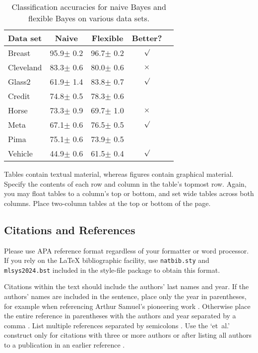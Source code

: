 \documentclass{article}
\begin{document}

\begin{table}[t]
\caption{Classification accuracies for naive Bayes and flexible
Bayes on various data sets.}
\label{sample-table}
\vskip 0.15in
\begin{center}
\begin{small}
\begin{sc}
\begin{tabular}{lcccr}
\toprule
Data set & Naive & Flexible & Better? \\
\midrule
Breast    & 95.9$\pm$ 0.2& 96.7$\pm$ 0.2& $\surd$ \\
Cleveland & 83.3$\pm$ 0.6& 80.0$\pm$ 0.6& $\times$\\
Glass2    & 61.9$\pm$ 1.4& 83.8$\pm$ 0.7& $\surd$ \\
Credit    & 74.8$\pm$ 0.5& 78.3$\pm$ 0.6&         \\
Horse     & 73.3$\pm$ 0.9& 69.7$\pm$ 1.0& $\times$\\
Meta      & 67.1$\pm$ 0.6& 76.5$\pm$ 0.5& $\surd$ \\
Pima      & 75.1$\pm$ 0.6& 73.9$\pm$ 0.5&         \\
Vehicle   & 44.9$\pm$ 0.6& 61.5$\pm$ 0.4& $\surd$ \\
\bottomrule
\end{tabular}
\end{sc}
\end{small}
\end{center}
\vskip -0.1in
\end{table}

Tables contain textual material, whereas figures contain graphical material.
Specify the contents of each row and column in the table's topmost
row. Again, you may float tables to a column's top or bottom, and set
wide tables across both columns. Place two-column tables at the
top or bottom of the page.

\subsection{Citations and References}

Please use APA reference format regardless of your formatter
or word processor. If you rely on the \LaTeX\/ bibliographic
facility, use \texttt{natbib.sty} and \texttt{mlsys2024.bst}
included in the style-file package to obtain this format.

Citations within the text should include the authors' last names and
year. If the authors' names are included in the sentence, place only
the year in parentheses, for example when referencing Arthur Samuel's
pioneering work . Otherwise place the entire
reference in parentheses with the authors and year separated by a
comma \cite{Samuel59}. List multiple references separated by
semicolons \cite{kearns89,Samuel59,mitchell80}. Use the `et~al.'
construct only for citations with three or more authors or after
listing all authors to a publication in an earlier reference \cite{MachineLearningI}.
\end{document}
